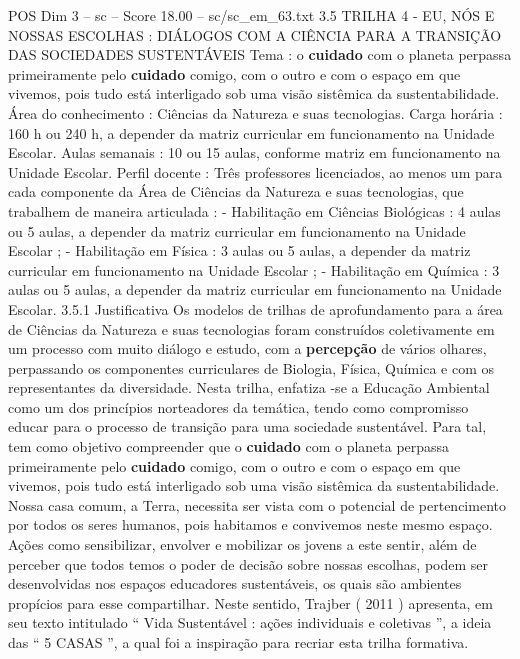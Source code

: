 \begin{textsample}{POS Dim 3 – sc – Score 18.00 – sc/sc\_em\_63.txt}  \label{ex:f3_pos_067}
3.5 TRILHA 4 - EU, NÓS E NOSSAS ESCOLHAS : DIÁLOGOS COM A CIÊNCIA PARA A TRANSIÇÃO DAS SOCIEDADES SUSTENTÁVEIS Tema : o \textbf{cuidado} com o planeta perpassa primeiramente pelo \textbf{cuidado} comigo, com o outro e com o espaço em que vivemos, pois tudo está interligado sob uma visão sistêmica da sustentabilidade.
Área do conhecimento : Ciências da Natureza e suas tecnologias.
Carga horária : 160 h ou 240 h, a depender da matriz curricular em funcionamento na Unidade Escolar.
Aulas semanais : 10 ou 15 aulas, conforme matriz em funcionamento na Unidade Escolar.
Perfil docente : Três professores licenciados, ao menos um para cada componente da Área de Ciências da Natureza e suas tecnologias, que trabalhem de maneira articulada : - Habilitação em Ciências Biológicas : 4 aulas ou 5 aulas, a depender da matriz curricular em funcionamento na Unidade Escolar ; - Habilitação em Física : 3 aulas ou 5 aulas, a depender da matriz curricular em funcionamento na Unidade Escolar ; - Habilitação em Química : 3 aulas ou 5 aulas, a depender da matriz curricular em funcionamento na Unidade Escolar. 3.5.1 Justificativa Os modelos de trilhas de aprofundamento para a área de Ciências da Natureza e suas tecnologias foram construídos coletivamente em um processo com muito diálogo e estudo, com a \textbf{percepção} de vários olhares, perpassando os componentes curriculares de Biologia, Física, Química e com os representantes da diversidade.
Nesta trilha, enfatiza -se a Educação Ambiental como um dos princípios norteadores da temática, tendo como compromisso educar para o processo de transição para uma sociedade sustentável.
Para tal, tem como objetivo compreender que o \textbf{cuidado} com o planeta perpassa primeiramente pelo \textbf{cuidado} comigo, com o outro e com o espaço em que vivemos, pois tudo está interligado sob uma visão sistêmica da sustentabilidade.
Nossa casa comum, a Terra, necessita ser vista com o potencial de pertencimento por todos os seres humanos, pois habitamos e convivemos neste mesmo espaço.
Ações como sensibilizar, envolver e mobilizar os jovens a este sentir, além de perceber que todos temos o poder de decisão sobre nossas escolhas, podem ser desenvolvidas nos espaços educadores sustentáveis, os quais são ambientes propícios para esse compartilhar.
Neste sentido, Trajber ( 2011 ) apresenta, em seu texto intitulado “ Vida Sustentável : ações individuais e coletivas ”, a ideia das “ 5 CASAS ”, a qual foi a inspiração para recriar esta trilha formativa.

\end{textsample}
